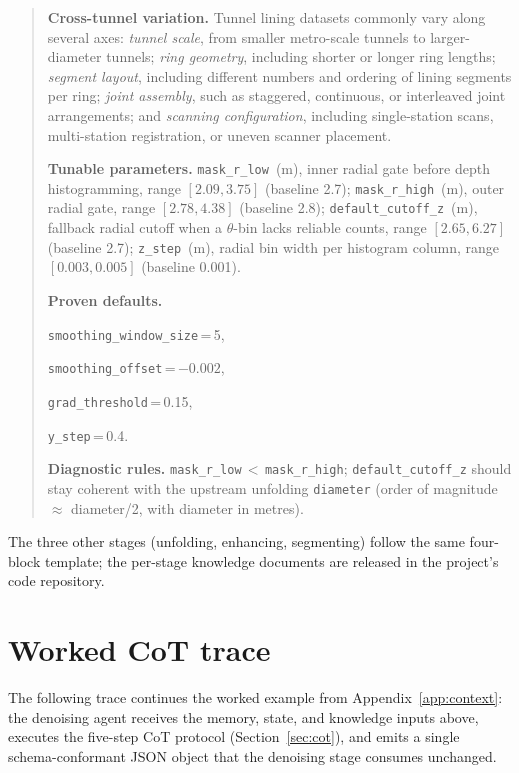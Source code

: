 \begin{quote}\small
\textbf{Cross-tunnel variation.}
Tunnel lining datasets commonly vary along several axes:
\textit{tunnel scale}, from smaller metro-scale tunnels to larger-diameter tunnels;
\textit{ring geometry}, including shorter or longer ring lengths;
\textit{segment layout}, including different numbers and ordering of lining segments per ring;
\textit{joint assembly}, such as staggered, continuous, or interleaved joint arrangements;
and \textit{scanning configuration}, including single-station scans, multi-station registration, or uneven scanner placement.

\textbf{Tunable parameters.}
\texttt{mask\_r\_low}~(m), inner radial gate before depth histogramming, range $[2.09, 3.75]$ (baseline 2.7);
\texttt{mask\_r\_high}~(m), outer radial gate, range $[2.78, 4.38]$ (baseline 2.8);
\texttt{default\_cutoff\_z}~(m), fallback radial cutoff when a $\theta$-bin lacks reliable counts, range $[2.65, 6.27]$ (baseline 2.7);
\texttt{z\_step}~(m), radial bin width per histogram column, range $[0.003, 0.005]$ (baseline 0.001).

\textbf{Proven defaults.}\par
\texttt{smoothing\_window\_size}\,=\,5,\par
\texttt{smoothing\_offset}\,=\,$-0.002$,\par
\texttt{grad\_threshold}\,=\,0.15,\par
\texttt{y\_step}\,=\,0.4.

\textbf{Diagnostic rules.}
\texttt{mask\_r\_low}\,$<$\,\texttt{mask\_r\_high};
\texttt{default\_cutoff\_z} should stay coherent with the upstream unfolding \texttt{diameter} (order of magnitude $\approx$ diameter/2, with diameter in metres).
\end{quote}

The three other stages (unfolding, enhancing, segmenting) follow the same four-block template; the per-stage knowledge documents are released in the project's code repository.

\section{Worked CoT trace}\label{app:cot}

The following trace continues the worked example from Appendix~\ref{app:context}: the denoising agent receives the memory, state, and knowledge inputs above, executes the five-step CoT protocol (Section~\ref{sec:cot}), and emits a single schema-conformant JSON object that the denoising stage consumes unchanged.

